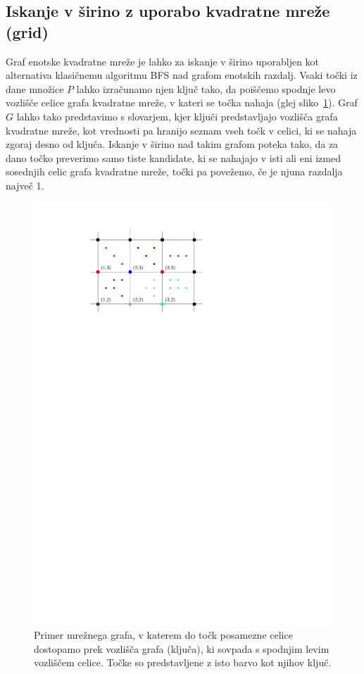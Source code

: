 \documentclass[a4paper, 12pt]{book}
\begin{document}

\subsection{Iskanje v širino z uporabo kvadratne mreže (grid)}
\label{grid-chapter}
Graf enotske kvadratne mreže je lahko za iskanje v širino uporabljen kot alternativa klasičnemu algoritmu BFS nad grafom enotskih razdalj. Vsaki točki iz dane množice $P$ lahko izračunamo njen ključ tako, da poiščemo spodnje levo vozlišče celice grafa kvadratne mreže, v kateri se točka nahaja (glej sliko~\ref{grid-fig}). Graf $G$ lahko tako predstavimo s slovarjem, kjer ključi predstavljajo vozlišča grafa kvadratne mreže, kot vrednosti pa hranijo seznam vseh točk v celici, ki se nahaja zgoraj desno od ključa. Iskanje v širino nad takim grafom poteka tako, da za dano točko preverimo samo tiste kandidate, ki se nahajajo v isti ali eni izmed sosednjih celic grafa kvadratne mreže, točki pa povežemo, če je njuna razdalja največ 1.

\begin{figure}[htp]
\centerline{\includegraphics[scale=1.2]{pics/grid.pdf}}
\caption{Primer mrežnega grafa, v katerem do točk posamezne celice dostopamo prek vozlišča grafa (ključa), ki sovpada s spodnjim levim vozliščem celice. Točke so predstavljene z isto barvo kot njihov ključ.}
\label{grid-fig}
\end{figure}
\end{document}
